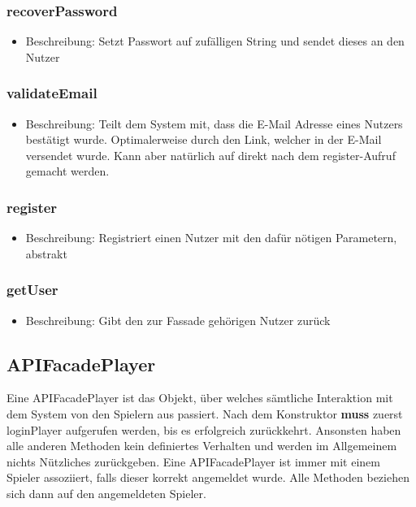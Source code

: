 \documentclass[a4paper]{scrreprt}
\begin{document}
    \subsubsection{recoverPassword}
    \begin{itemize}
        \item Beschreibung: Setzt Passwort auf zufälligen String und sendet dieses an den Nutzer
    \end{itemize}
    \subsubsection{validateEmail}
    \begin{itemize}
        \item Beschreibung: Teilt dem System mit, dass die E-Mail Adresse eines Nutzers bestätigt wurde. Optimalerweise durch den Link, welcher in der E-Mail versendet wurde. Kann aber natürlich auf direkt nach dem register-Aufruf gemacht werden.
    \end{itemize}
    \subsubsection{register}
    \begin{itemize}
        \item Beschreibung: Registriert einen Nutzer mit den dafür nötigen Parametern, abstrakt
    \end{itemize}
    \subsubsection{getUser}
    \begin{itemize}
        \item Beschreibung: Gibt den zur Fassade gehörigen Nutzer zurück
    \end{itemize}

    \subsection{APIFacadePlayer}
    Eine APIFacadePlayer ist das Objekt, über welches sämtliche Interaktion mit dem System von den Spielern aus passiert. Nach dem Konstruktor \textbf{muss} zuerst loginPlayer aufgerufen werden, bis es erfolgreich zurückkehrt. Ansonsten haben alle anderen Methoden kein definiertes Verhalten und werden im Allgemeinem nichts Nützliches zurückgeben. Eine APIFacadePlayer ist immer mit einem Spieler assoziiert, falls dieser korrekt angemeldet wurde. Alle Methoden beziehen sich dann auf den angemeldeten Spieler.
\end{document}
